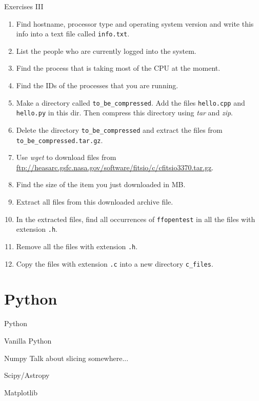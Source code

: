 \documentclass{beamer}
\begin{document}
\begin{frame}{Exercises III}
  \fontsize{8pt}{8}\selectfont
  \begin{enumerate}
    \item Find hostname, processor type and operating system version and write this info into a text file called \texttt{info.txt}.
    \item List the people who are currently logged into the system.
    \item Find the process that is taking most of the CPU at the moment.
    \item Find the IDs of the processes that you are running.
    \item Make a directory called \texttt{to\_be\_compressed}. Add the files \texttt{hello.cpp} and \texttt{hello.py} in this dir.
    Then compress this directory using \textit{tar} and \textit{zip}.
    \item Delete the directory \texttt{to\_be\_compressed} and extract the files from \texttt{to\_be\_compressed.tar.gz}.
    \item Use \textit{wget} to download files from \url{ftp://heasarc.gsfc.nasa.gov/software/fitsio/c/cfitsio3370.tar.gz}.
    \item Find the size of the item you just downloaded in MB.
    \item Extract all files from this downloaded archive file.
    \item In the extracted files, find all occurrences of \texttt{ffopentest} in all the files with extension \texttt{.h}.
    \item Remove all the files with extension \texttt{.h}.
    \item Copy the files with extension \texttt{.c} into a new directory \texttt{c\_files}.
  \end{enumerate}
\end{frame}

\section{Python}

\begin{frame}{Python}
  \begin{block}{Vanilla Python}

  \end{block}

  \begin{block}{Numpy}
      Talk about slicing somewhere...
  \end{block}

  \begin{block}{Scipy/Astropy}

  \end{block}

  \begin{block}{Matplotlib}
 
  \end{block}
\end{frame}
\end{document}

